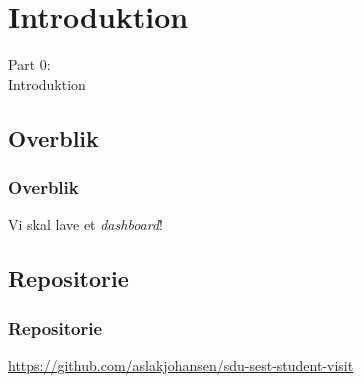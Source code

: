 \section{Introduktion}
\begin{frame}
    \vspace{25mm}
    \begin{center}
        \Huge{Part 0:\\Introduktion}
    \end{center}
\end{frame}

\subsection{Overblik}
\begin{frame}
    \frametitle{Overblik}
    \begin{center}
    \end{center}
    \vspace{8mm}
    Vi skal lave et \textsl{dashboard}!
\end{frame}

\subsection{Repositorie}
\begin{frame}
    \frametitle{Repositorie}
    \begin{center}
      \url{https://github.com/aslakjohansen/sdu-sest-student-visit}
    \end{center}
\end{frame}

